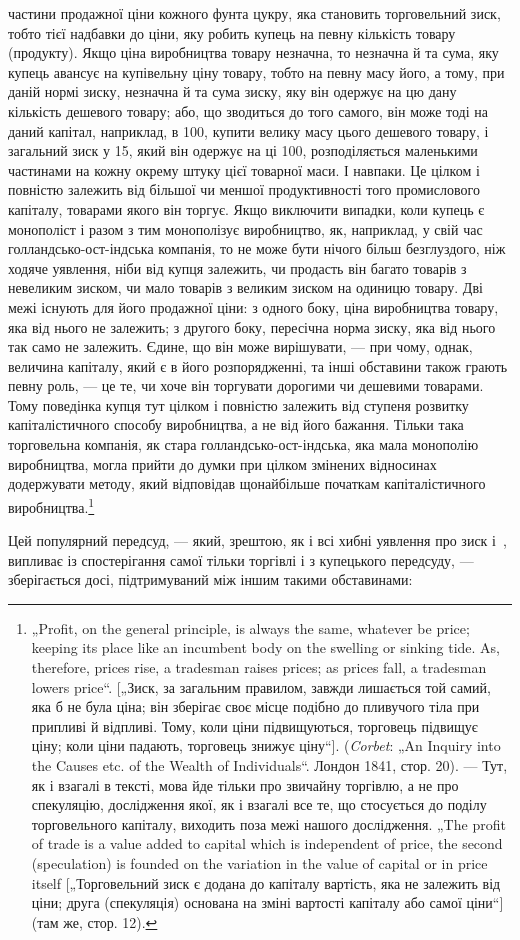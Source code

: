 \parcont{}  %
частини продажної ціни кожного фунта цукру, яка становить
торговельний зиск, тобто тієї надбавки до ціни, яку робить
купець на певну кількість товару (продукту). Якщо ціна виробництва
товару незначна, то незначна й та сума, яку купець
авансує на купівельну ціну товару, тобто на певну масу його,
а тому, при даній нормі зиску, незначна й та сума зиску, яку
він одержує на цю дану кількість дешевого товару; або, що
зводиться до того самого, він може тоді на даний капітал, наприклад,
в 100, купити велику масу цього дешевого товару,
і загальний зиск у 15, який він одержує на ці 100, розподіляється
маленькими частинами на кожну окрему штуку цієї товарної
маси. І навпаки. Це цілком і повністю залежить від більшої
чи меншої продуктивності того промислового капіталу, товарами
якого він торгує. Якщо виключити випадки, коли купець є монополіст
і разом з тим монополізує виробництво, як, наприклад,
у свій час голландсько-ост-індська компанія, то не може бути
нічого більш безглуздого, ніж ходяче уявлення, ніби від купця
залежить, чи продасть він багато товарів з невеликим зиском,
чи мало товарів з великим зиском на одиницю товару. Дві
межі існують для його продажної ціни: з одного боку, ціна виробництва
товару, яка від нього не залежить; з другого боку, пересічна
норма зиску, яка від нього так само не залежить. Єдине,
що він може вирішувати, — при чому, однак, величина капіталу,
який є в його розпорядженні, та інші обставини також грають
певну роль, — це те, чи хоче він торгувати дорогими чи дешевими
товарами. Тому поведінка купця тут цілком і повністю залежить
від ступеня розвитку капіталістичного способу виробництва,
а не від його бажання. Тільки така торговельна компанія, як стара
голландсько-ост-індська, яка мала монополію виробництва, могла
прийти до думки при цілком змінених відносинах додержувати
методу, який відповідав щонайбільше початкам капіталістичного
виробництва.\footnote{
„Profit, on the general principle, is always the same, whatever be price;
keeping its place like an incumbent body on the swelling or sinking tide. As,
therefore, prices rise, a tradesman raises prices; as prices fall, a tradesman lowers
price“. [„Зиск, за загальним правилом, завжди лишається той самий, яка б не була
ціна; він зберігає своє місце подібно до пливучого тіла при припливі й відпливі.
Тому, коли ціни підвищуються, торговець підвищує ціну; коли ціни падають,
торговець знижує ціну“]. (\emph{Corbet}: „An Inquiry into the Causes etc. of the Wealth
of Individuals“. Лондон 1841, стор. 20). — Тут, як і взагалі в тексті, мова йде
тільки про звичайну торгівлю, а не про спекуляцію, дослідження якої, як і взагалі
все те, що стосується до поділу торговельного капіталу, виходить поза
межі нашого дослідження. „The profit of trade is a value added to capital which
is independent of price, the second (speculation) is founded on the variation in
the value of capital or in price itself [„Торговельний зиск є додана до капіталу
вартість, яка не залежить від ціни; друга (спекуляція) основана на зміні вартості
капіталу або самої ціни“] (там же, стор. 12).
}

Цей популярний передсуд, — який, зрештою, як і всі хибні
уявлення про зиск і~, випливає із спостерігання самої тільки
торгівлі і з купецького передсуду, — зберігається досі, підтримуваний
між іншим такими обставинами:
\parbreak{}  %

